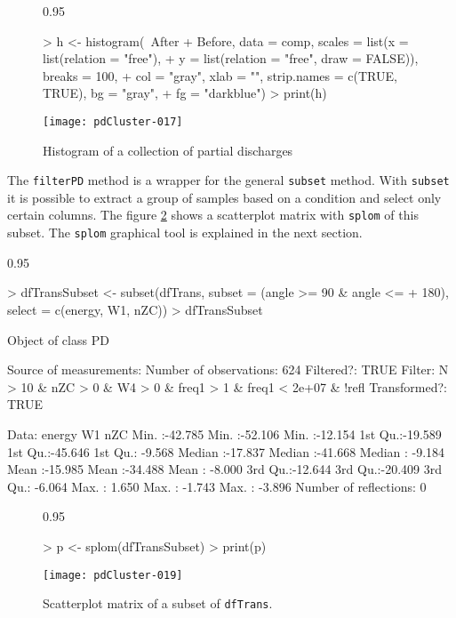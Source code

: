 \documentclass{article}
\renewenvironment{Schunk}{\begin{center}
    \scriptsize
    \begin{boxedminipage}{0.95\textwidth}}{
    \end{boxedminipage}\end{center}}
\begin{document}
\begin{figure}
  \centering
\begin{Schunk}
\begin{Sinput}
> h <- histogram(~After + Before, data = comp, scales = list(x = list(relation = "free"), 
+     y = list(relation = "free", draw = FALSE)), breaks = 100, 
+     col = "gray", xlab = "", strip.names = c(TRUE, TRUE), bg = "gray", 
+     fg = "darkblue")
> print(h)
\end{Sinput}
\end{Schunk}
\texttt{[image: pdCluster-017]}
  \caption{Histogram of a collection of partial discharges}
  \label{fig:histogram}
\end{figure}

The \texttt{filterPD} method is a wrapper for the general
\texttt{subset} method. With \texttt{subset} it is possible to extract
a group of samples based on a condition and select only certain
columns. The figure \ref{fig:splom_subset} shows a scatterplot matrix
with \texttt{splom} of this subset. The \texttt{splom} graphical tool
is explained in the next section.
\begin{Schunk}
\begin{Sinput}
> dfTransSubset <- subset(dfTrans, subset = (angle >= 90 & angle <= 
+     180), select = c(energy, W1, nZC))
> dfTransSubset
\end{Sinput}
\begin{Soutput}
Object of class  PD 

Source of measurements:  
Number of observations:  624 
Filtered?:  TRUE 
Filter: N > 10 & nZC > 0 & W4 > 0 & freq1 > 1 & freq1 < 2e+07 & !refl
Transformed?: TRUE 

Data:
     energy              W1               nZC         
 Min.   :-42.785   Min.   :-52.106   Min.   :-12.154  
 1st Qu.:-19.589   1st Qu.:-45.646   1st Qu.: -9.568  
 Median :-17.837   Median :-41.668   Median : -9.184  
 Mean   :-15.985   Mean   :-34.488   Mean   : -8.000  
 3rd Qu.:-12.644   3rd Qu.:-20.409   3rd Qu.: -6.064  
 Max.   :  1.650   Max.   : -1.743   Max.   : -3.896  
Number of reflections:  0 
\end{Soutput}
\end{Schunk}

\begin{figure}
  \centering
\begin{Schunk}
\begin{Sinput}
> p <- splom(dfTransSubset)
> print(p)
\end{Sinput}
\end{Schunk}
\texttt{[image: pdCluster-019]}
  \caption{Scatterplot matrix of a subset of \texttt{dfTrans}.}
  \label{fig:splom_subset}
\end{figure}
\end{document}
